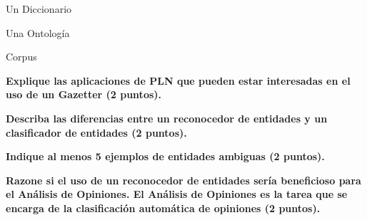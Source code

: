 \documentclass[11pt]{exam}
\begin{document}
\begin{questions}
Un Diccionario

Una Ontología

Corpus

{\bf \question Explique las aplicaciones de PLN que pueden estar interesadas en el uso de un Gazetter (2 puntos).}

{\bf \question Describa las diferencias entre un reconocedor de entidades y un clasificador de entidades (2 puntos).}

{\bf \question Indique al menos 5 ejemplos de entidades ambiguas (2 puntos).}

{\bf \question Razone si el uso de un reconocedor de entidades sería beneficioso para el Análisis de Opiniones. El Análisis de Opiniones es la tarea que se encarga de la clasificación automática de opiniones (2 puntos).}

\end{questions}
\end{document}
